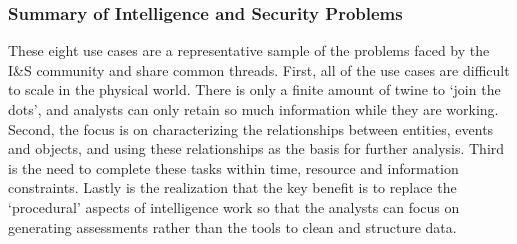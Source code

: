 

\subsubsection{Summary of Intelligence and Security Problems}
These eight use cases are a representative sample of the problems faced by the I\&S community and share common threads.
First, all of the use cases are difficult to scale in the physical world.
There is only a finite amount of twine to `join the dots', and analysts can only retain so much information while they are working. 
Second, the focus is on characterizing the relationships between entities, events and objects, and using these relationships as the basis for further analysis. 
Third is the need to complete these tasks within time, resource and information constraints. 
Lastly is the realization that the key benefit is to replace the `procedural' aspects of intelligence work so that the analysts can focus on generating assessments rather than the tools to clean and structure data. 

